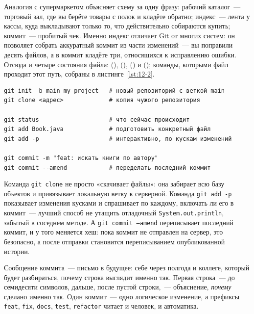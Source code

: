 Аналогия с супермаркетом объясняет схему за одну фразу: рабочий каталог~--- торговый зал, где вы берёте товары с полок и кладёте обратно; индекс~--- лента у кассы, куда выкладывают только то, что действительно собираются купить; коммит~--- пробитый чек. Именно индекс отличает Git от многих систем: он позволяет собрать аккуратный коммит из части изменений~--- вы поправили десять файлов, а в коммит кладёте три, относящихся к исправлению ошибки. Отсюда и четыре состояния файла:  (),  (),  () и  (); команды, которыми файл проходит этот путь, собраны в листинге~\ref{lst:12-2}.

\begin{listing}[H]
\begin{verbatim}
git init -b main my-project   # новый репозиторий с веткой main
git clone <адрес>             # копия чужого репозитория

git status                    # что сейчас происходит
git add Book.java             # подготовить конкретный файл
git add -p                    # интерактивно, по кускам изменений

git commit -m "feat: искать книги по автору"
git commit --amend            # переделать последний коммит
\end{verbatim}
\caption{Создание репозитория и первые коммиты}
\label{lst:12-2}
\end{listing}

Команда \texttt{git clone} не просто «скачивает файлы»: она забирает всю базу объектов и привязывает локальную ветку к серверной. Команда \texttt{git add -p} показывает изменения кусками и спрашивает по каждому, включать ли его в коммит~--- лучший способ не утащить отладочный \texttt{System.out.println}, забытый в соседнем методе. А \texttt{git commit --amend} переписывает последний коммит, и у того меняется хеш: пока коммит не отправлен на сервер, это безопасно, а после отправки становится переписыванием опубликованной истории.

Сообщение коммита~--- письмо в будущее: себе через полгода и коллеге, который будет разбираться, почему строка выглядит именно так. Первая строка~--- до семидесяти символов, дальше, после пустой строки,~--- объяснение, \emph{почему} сделано именно так. Один коммит~--- одно логическое изменение, а префиксы \texttt{feat}, \texttt{fix}, \texttt{docs}, \texttt{test}, \texttt{refactor} читает и человек, и автоматика.

